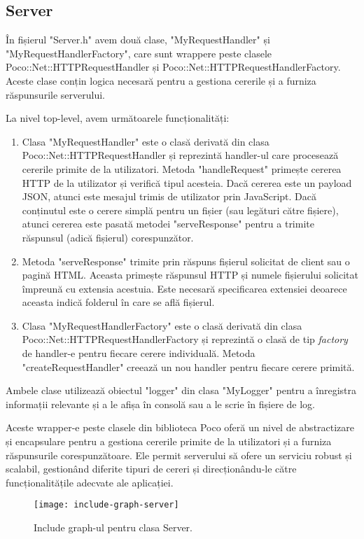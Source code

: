 \subsection{Server}

În fișierul "Server.h" avem două clase, "MyRequestHandler" și "MyRequestHandlerFactory", care sunt wrappere peste clasele Poco::Net::HTTPRequestHandler și Poco::Net::HTTPRequestHandlerFactory. Aceste clase conțin logica necesară pentru a gestiona cererile și a furniza răspunsurile serverului.

La nivel top-level, avem următoarele funcționalități:

\begin{enumerate}
  \item Clasa "MyRequestHandler" este o clasă derivată din clasa Poco::Net::HTTPRequestHandler și reprezintă handler-ul care procesează cererile primite de la utilizatori. Metoda "handleRequest" primește cererea HTTP de la utilizator și verifică tipul acesteia. Dacă cererea este un payload JSON, atunci este mesajul trimis de utilizator prin JavaScript. Dacă conținutul este o cerere simplă pentru un fișier (sau legături către fișiere), atunci cererea este pasată metodei "serveResponse" pentru a trimite răspunsul (adică fișierul) corespunzător.

  \item Metoda "serveResponse" trimite prin răspuns fișierul solicitat de client sau o pagină HTML. Aceasta primește răspunsul HTTP și numele fișierului solicitat împreună cu extensia acestuia. Este necesară specificarea extensiei deoarece aceasta indică folderul în care se află fișierul.

  \item Clasa "MyRequestHandlerFactory" este o clasă derivată din clasa Poco::Net::HTTPRequestHandlerFactory și reprezintă o clasă de tip \emph{factory} de handler-e pentru fiecare cerere individuală. Metoda "createRequestHandler" creează un nou handler pentru fiecare cerere primită.
\end{enumerate}

Ambele clase utilizează obiectul "logger" din clasa "MyLogger" pentru a înregistra informații relevante și a le afișa în consolă sau a le scrie în fișiere de log.

Aceste wrapper-e peste clasele din biblioteca Poco oferă un nivel de abstractizare și encapsulare pentru a gestiona cererile primite de la utilizatori și a furniza răspunsurile corespunzătoare. Ele permit serverului să ofere un serviciu robust și scalabil, gestionând diferite tipuri de cereri și direcționându-le către funcționalitățile adecvate ale aplicației.

\begin{figure}[h]
  \centering
  \texttt{[image: include-graph-server]}
  \caption{Include graph-ul pentru clasa Server.}
  \label{fig:includeGraphServer}
\end{figure}